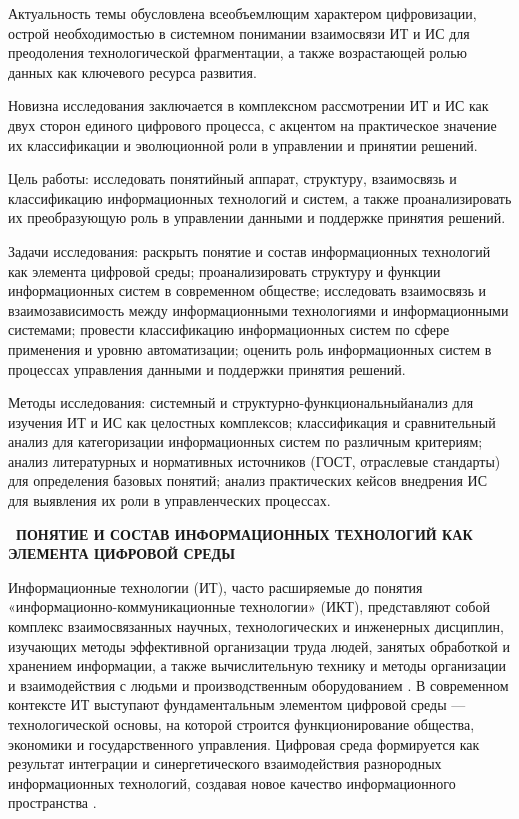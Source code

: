 \documentclass{SibFU-docs}
\begin{document}
Актуальность темы обусловлена всеобъемлющим характером цифровизации, острой необходимостью в системном понимании взаимосвязи ИТ и ИС для преодоления технологической фрагментации, а также возрастающей ролью данных как ключевого ресурса развития.

Новизна исследования заключается в комплексном рассмотрении ИТ и ИС как двух сторон единого цифрового процесса, с акцентом на практическое значение их классификации и эволюционной роли в управлении и принятии решений.

Цель работы: исследовать понятийный аппарат, структуру, взаимосвязь и классификацию информационных технологий и систем, а также проанализировать их преобразующую роль в управлении данными и поддержке принятия решений.

Задачи исследования: раскрыть понятие и состав информационных технологий как элемента цифровой среды; проанализировать структуру и функции информационных систем в современном обществе; исследовать взаимосвязь и взаимозависимость между информационными технологиями и информационными системами;
провести классификацию информационных систем по сфере применения и уровню автоматизации; оценить роль информационных систем в процессах управления данными и поддержки принятия решений.

Методы исследования: системный и структурно-функциональныйанализ для изучения ИТ и ИС как целостных комплексов; классификация и сравнительный анализ для категоризации информационных систем по различным критериям; анализ литературных и нормативных источников (ГОСТ, отраслевые стандарты) для определения базовых понятий; анализ практических кейсов внедрения ИС для выявления их роли в управленческих процессах.

\newpage
\vspace*{-2.5em}
\begin{center}\textbf{\thesection\ ПОНЯТИЕ И СОСТАВ ИНФОРМАЦИОННЫХ ТЕХНОЛОГИЙ КАК ЭЛЕМЕНТА ЦИФРОВОЙ СРЕДЫ}\end{center}
\vspace*{-1.5em}

Информационные технологии (ИТ), часто расширяемые до понятия «информационно-коммуникационные технологии» (ИКТ), представляют собой комплекс взаимосвязанных научных, технологических и инженерных дисциплин, изучающих методы эффективной организации труда людей, занятых обработкой и хранением информации, а также вычислительную технику и методы организации и взаимодействия с людьми и производственным оборудованием \cite{rosstat_it_def}. В современном контексте ИТ выступают фундаментальным элементом цифровой среды — технологической основы, на которой строится функционирование общества, экономики и государственного управления. Цифровая среда формируется как результат интеграции и синергетического взаимодействия разнородных информационных технологий, создавая новое качество информационного пространства \cite{habr_digital_env}.
\end{document}

